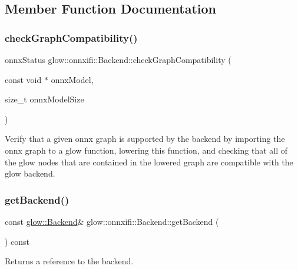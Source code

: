 \subsection{Member Function Documentation}
\mbox{\label{classglow_1_1onnxifi_1_1_backend_a79939dc106d9bbe5a32ddfb4ad4ca4d1}} 
\subsubsection{\texorpdfstring{check\+Graph\+Compatibility()}{checkGraphCompatibility()}}
{\footnotesize\ttfamily onnx\+Status glow\+::onnxifi\+::\+Backend\+::check\+Graph\+Compatibility (\begin{DoxyParamCaption}\item[{const void $\ast$}]{onnx\+Model,  }\item[{size\+\_\+t}]{onnx\+Model\+Size }\end{DoxyParamCaption})}

Verify that a given onnx graph is supported by the backend by importing the onnx graph to a glow function, lowering this function, and checking that all of the glow nodes that are contained in the lowered graph are compatible with the glow backend. \mbox{\label{classglow_1_1onnxifi_1_1_backend_abd60b559f37bb9aacb3c92afd08b5870}} 
\subsubsection{\texorpdfstring{get\+Backend()}{getBackend()}}
{\footnotesize\ttfamily const \hyperlink{classglow_1_1_backend}{glow\+::\+Backend}\& glow\+::onnxifi\+::\+Backend\+::get\+Backend (\begin{DoxyParamCaption}{ }\end{DoxyParamCaption}) const\hspace{0.3cm}{\ttfamily [inline]}}

\begin{DoxyReturn}{Returns}
a reference to the backend. 
\end{DoxyReturn}
\mbox{\label{classglow_1_1onnxifi_1_1_backend_a88246d856e8c190f8881409b9633af70}} 
